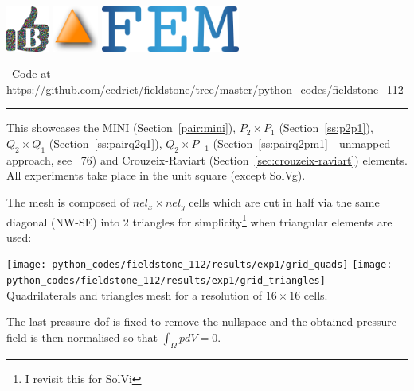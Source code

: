 \includegraphics[height=1.5cm]{images/pictograms/benchmark}
\includegraphics[height=1.5cm]{images/pictograms/triangle}
\includegraphics[height=1.5cm]{images/pictograms/FEM}



\begin{center}
\inpython~Code at \url{https://github.com/cedrict/fieldstone/tree/master/python_codes/fieldstone_112}
\end{center}

\par\noindent\rule{\textwidth}{0.4pt}


This \stone showcases the MINI (Section~\ref{pair:mini}), 
$P_2\times P_1$ (Section~\ref{ss:p2p1}), $Q_2\times Q_1$ (Section~\ref{ss:pairq2q1}), 
$Q_2\times P_{-1}$ (Section~\ref{ss:pairq2pm1} - unmapped approach, see \stone~76) 
and Crouzeix-Raviart  (Section~\ref{sec:crouzeix-raviart}) elements.
All experiments take place in the unit square (except SolVg). 

The mesh is composed of $nel_x \times nel_y$ cells which are cut in half via the same 
diagonal (NW-SE) into 2 triangles for simplicity\footnote{I revisit this for SolVi} 
when triangular elements are used: 

\begin{center}
\texttt{[image: python\_codes/fieldstone\_112/results/exp1/grid\_quads]}
\texttt{[image: python\_codes/fieldstone\_112/results/exp1/grid\_triangles]}\\
{\captionfont Quadrilaterals and triangles mesh for a resolution of $16\times 16$ cells.} 
\end{center}

The last pressure dof is fixed to remove the nullspace and the obtained pressure field
is then normalised so that $\int_\Omega p dV = 0$.

